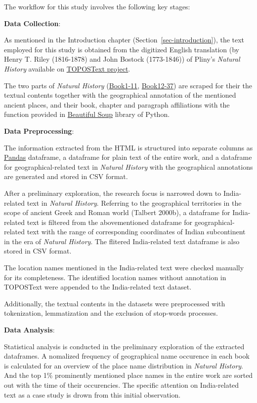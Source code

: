 \documentclass[
  12pt,
]{article}
\begin{document}
The workflow for this study involves the following key stages:

\textbf{Data Collection}:

As mentioned in the Introduction chapter
(Section~\ref{sec-introduction}), the text employed for this study is
obtained from the digitized English translation (by Henry T. Riley
(1816-1878) and John Bostock (1773-1846)) of Pliny's \emph{Natural
History} available on \href{https://topostext.org/the-project}{TOPOSText
project}.

The two parts of \emph{Natural History}
(\href{https://topostext.org/work/148}{Book1-11},
\href{https://topostext.org/work/153}{Book12-37}) are scraped for their
the textual contents together with the geographical annotation of the
mentioned ancient places, and their book, chapter and paragraph
affiliations with the function provided in
\href{https://www.crummy.com/software/BeautifulSoup/bs4/doc/}{Beautiful
Soup} library of Python.

\textbf{Data Preprocessing}:

The information extracted from the HTML is structured into separate
columns as \href{https://pandas.pydata.org/}{Pandas} dataframe, a
dataframe for plain text of the entire work, and a dataframe for
geographical-related text in \emph{Natural History} with the
geographical annotations are generated and stored in CSV format.

After a preliminary exploration, the research focus is narrowed down to
India-related text in \emph{Natural History}. Referring to the
geographical territories in the scope of ancient Greek and Roman world
(Talbert 2000b), a dataframe for India-related text is filtered from the
abovementioned dataframe for geographical-related text with the range of
corresponding coordinates of Indian subcontinent in the era of
\emph{Natural History}. The flitered India-related text dataframe is
also stored in CSV format.

The location names mentioned in the India-related text were checked
manually for its completeness. The identified location names without
annotation in TOPOSText were appended to the India-related text dataset.

Additionally, the textual contents in the datasets were preprocessed
with tokenization, lemmatization and the exclusion of stop-words
processes.

\textbf{Data Analysis}:

Statistical analysis is conducted in the preliminary exploration of the
extracted dataframes. A nomalized frequency of geographical name
occurence in each book is calculated for an overview of the place name
distribution in \emph{Natural History}. And the top 1\% prominently
mentioned place names in the entire work are sorted out with the time of
their occurencies. The specific attention on India-related text as a
case study is drown from this initial observation.
\end{document}
